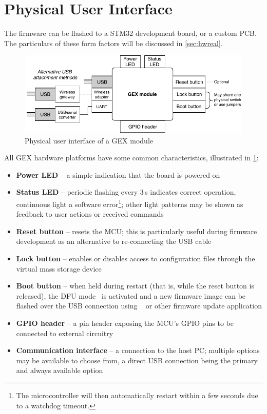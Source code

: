 \section{Physical User Interface}

The firmware can be flashed to a STM32 development board, or a custom \gls{PCB}. The particulars of these form factors will be discussed in \cref{sec:hwreal}.

\begin{figure}[h]
	\centering
	\includegraphics[scale=.95] {img/users-view.pdf}
	\caption{\label{fig:users_view_of_gex}Physical user interface of a GEX module}
\end{figure}

\noindent
All GEX hardware platforms have some common characteristics, illustrated in \cref{fig:users_view_of_gex}:

\begin{itemize}	
	\item \textbf{Power \gls{LED}} -- a simple indication that the board is powered on
	\item \textbf{Status \gls{LED}} -- periodic flashing every 3\,s indicates correct operation, continuous light a software error\footnote{The microcontroller will then automatically restart within a few seconds due to a watchdog timeout.}; other light patterns may be shown as feedback to user actions or received commands
	\item \textbf{Reset button} -- resets the \gls{MCU}; this is particularly useful during firmware development as an alternative to re-connecting the \gls{USB} cable
	\item \textbf{Lock button} -- enables or disables access to configuration files through the virtual mass storage device
	\item \textbf{Boot button} -- when held during restart (that is, while the reset button is released), the \gls{DFU} mode~\cite{usbif-dfu} is activated and a new firmware image can be flashed over the \gls{USB} connection using ~\cite{dfu-util} or other firmware update application
	\item \textbf{\gls{GPIO} header} -- a pin header exposing the \gls{MCU}'s \gls{GPIO} pins to be connected to external circuitry
	\item \textbf{Communication interface} -- a connection to the host \gls{PC}; multiple options may be available to choose from, a direct \gls{USB} connection being the primary and always available option
\end{itemize}

